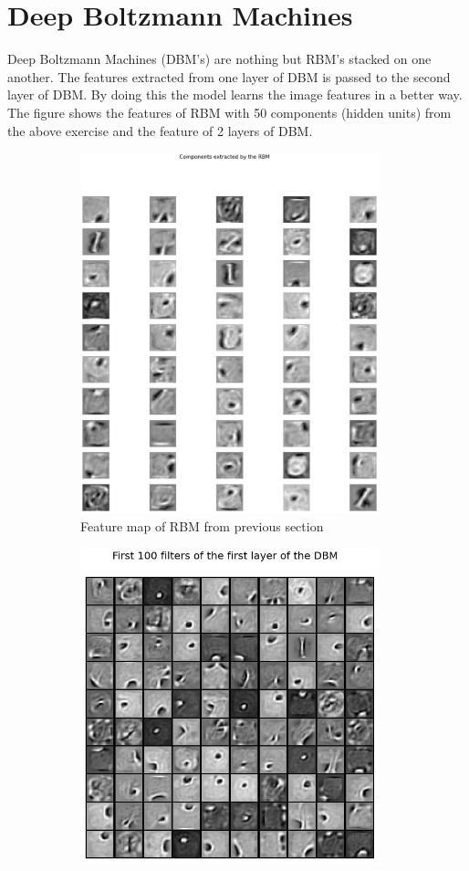 \section{Deep Boltzmann Machines}
Deep Boltzmann Machines (DBM's) are nothing but RBM's stacked on one another. The features extracted from one layer of DBM is passed to the second layer of DBM. By doing this the model learns the image features in a better way. The figure shows the features of RBM with 50 components (hidden units) from the above exercise and the feature of 2 layers of DBM. 
\begin{figure}[ht]
	\begin{subfigure}[b]{0.33\textwidth}
		\centering
		\captionsetup{ width=0.9\linewidth, format = hang}
		\includegraphics[height = 0.8\textwidth, width = 0.95\textwidth]{Exercise4/Report/rbm_features}
		\caption{Feature map of RBM from previous section}\label{fig:rbm_features}
	\end{subfigure}%
	\begin{subfigure}[b]{0.33\textwidth}
		\centering
		\captionsetup{width=0.9\linewidth, format = hang}
		\includegraphics[height = 0.8\textwidth, width = 0.95\textwidth]{Exercise4/Report/dbm_feature_1}

\end{subfigure}
\end{figure}
